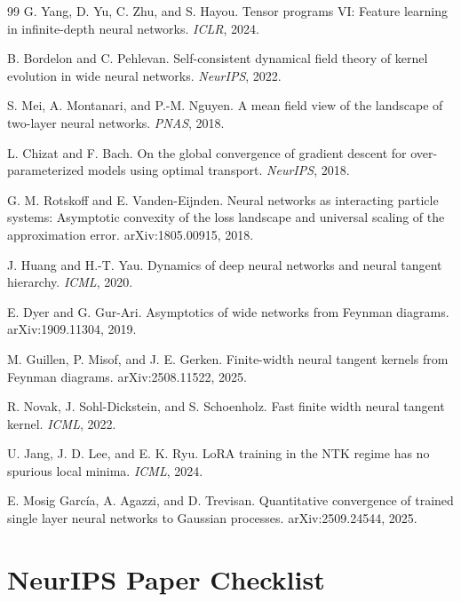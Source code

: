 \documentclass{article}
\begin{document}
\begin{thebibliography}{99}
G. Yang, D. Yu, C. Zhu, and S. Hayou.
\newblock Tensor programs VI: Feature learning in infinite-depth neural networks.
\newblock \emph{ICLR}, 2024.

B. Bordelon and C. Pehlevan.
\newblock Self-consistent dynamical field theory of kernel evolution in wide neural networks.
\newblock \emph{NeurIPS}, 2022.

S. Mei, A. Montanari, and P.-M. Nguyen.
\newblock A mean field view of the landscape of two-layer neural networks.
\newblock \emph{PNAS}, 2018.

L. Chizat and F. Bach.
\newblock On the global convergence of gradient descent for over-parameterized models using optimal transport.
\newblock \emph{NeurIPS}, 2018.

G. M. Rotskoff and E. Vanden-Eijnden.
\newblock Neural networks as interacting particle systems: Asymptotic convexity of the loss landscape and universal scaling of the approximation error.
\newblock arXiv:1805.00915, 2018.

J. Huang and H.-T. Yau.
\newblock Dynamics of deep neural networks and neural tangent hierarchy.
\newblock \emph{ICML}, 2020.

E. Dyer and G. Gur-Ari.
\newblock Asymptotics of wide networks from Feynman diagrams.
\newblock arXiv:1909.11304, 2019.

M. Guillen, P. Misof, and J. E. Gerken.
\newblock Finite-width neural tangent kernels from Feynman diagrams.
\newblock arXiv:2508.11522, 2025.

R. Novak, J. Sohl-Dickstein, and S. Schoenholz.
\newblock Fast finite width neural tangent kernel.
\newblock \emph{ICML}, 2022.

U. Jang, J. D. Lee, and E. K. Ryu.
\newblock LoRA training in the NTK regime has no spurious local minima.
\newblock \emph{ICML}, 2024.

E. Mosig García, A. Agazzi, and D. Trevisan.
\newblock Quantitative convergence of trained single layer neural networks to Gaussian processes.
\newblock arXiv:2509.24544, 2025.
\end{thebibliography}

\section*{NeurIPS Paper Checklist}
\end{document}
